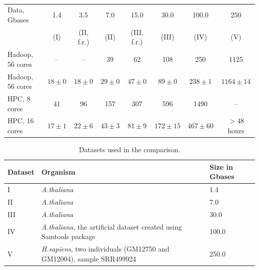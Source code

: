 \documentclass[10pt]{article}
\newcommand{\Change}[1]{{\color{ChangeColor}{#1}}}
\begin{document}
\begin{table}[!ht]
\small

\caption{%
	\Change{%
	Timings (in minutes) for processing different dataset sizes on the HPC and
	Hadoop deployments with their respective pipelines. Datasets are labelled by
	Roman numerals, (``f.r.'' stands for ``forward reads''). The large variance
	for the HPC deployment is due to Samtools BAM sorting, which is I/O and memory
	intensive; the data splillage to the file system makes it very susceptible to
	the load of the entire shared HPC cluster.
	}
}

\begin{center}
\begin{tabular}{l|c|c|c|c|c|c|c}

Data, Gbases		&	1.4	&	3.5		&	7.0		&	15.0		&	30.0		&	100.0	&	250 	\\
				&	(I)	&	(II, f.r.)	&	(II)		&	(III, f.r.)	&	(III)		&	(IV)		&	(V)\\
\hline
Hadoop, 56 cores&--&	--	&39		&62	&108	&250&1125\\
Hadoop, 56 cores		&	$18\pm0	$	&	$18\pm0	$	&	$29\pm0$	&	$47\pm0	$	&	$89\pm0$	&	$238\pm1$		&	$1164\pm14$\\
HPC, 8 cores&	41&	96	&157	&307	&596	&1490&--\\
HPC, 16 cores	&	$17\pm1$	&	$22\pm6$	&	$43\pm3$	&	$81\pm9$	&	$172\pm15$		&	$467\pm60$	& $>48$ hours\\

\end{tabular}
\end{center}
\label{table:4}
\normalsize
\end{table}%


\begin{table}[!ht]
\small
\footnotesize
\caption{Datasets used in the comparison. }
\begin{center}
\begin{tabular}{|l|l|l|}
Dataset &	Organism &	Size in Gbases\\
\hline
 I		&	{\it A.thaliana}	&	1.4	\\
 II	&	{\it A.thaliana}	&	7.0\\
 III	&	{\it A.thaliana}	&	30.0	\\
 IV	&{\it A.thaliana}, the artificial dataset created using Samtools package	&	100.0	\\
 V	&	{\it H.sapiens}, two individuals (GM12750 and GM12004), sample SRR499924		&	250.0\\

\end{tabular}
\end{center}
\label{table:datasets}
\normalsize
\end{table}%
\end{document}
